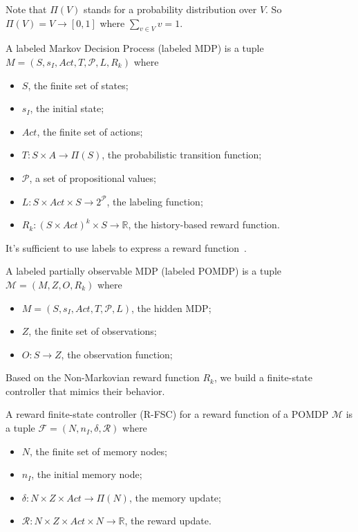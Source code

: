 Note that $\Pi(V)$ stands for a probability distribution over $V$. So $\Pi(V)=V\to [0,1]$ where $\sum_{v\in V}v=1$.

\begin{definition}
	A labeled Markov Decision Process (labeled MDP) is a tuple $M=(S,s_I,Act,T,\mathcal{P},L,R_k)$ where 
	\begin{itemize}
		\item $S$, the finite set of states;
		\item $s_I$, the initial state;
		\item $Act$, the finite set of actions;
		\item $T:S\times A\to \Pi(S)$, the probabilistic transition function;
		\item $\mathcal{P}$, a set of propositional values;
		\item $L:S\times Act\times S\to 2^\mathcal{P}$, the labeling function;
		\item $R_k:(S\times Act)^k\times S \to \mathbb{R}$, the history-based reward function.
	\end{itemize}
\end{definition}

It's sufficient to use labels to express a reward function~\cite{p:jirp}.

\begin{definition}
	A labeled partially observable MDP (labeled POMDP) is a tuple $\mathcal{M}=(M, Z, O, R_k)$ where 
	\begin{itemize}
		\item $M=(S,s_I,Act,T,\mathcal{P},L)$, the hidden MDP;
		\item $Z$, the finite set of observations;
		\item $O:S\to Z$, the observation function;
	\end{itemize}
\end{definition}

Based on the Non-Markovian reward function $R_k$, we build a finite-state controller that mimics their behavior.

\begin{definition}
	A reward finite-state controller (R-FSC) for a reward function of a POMDP $\mathcal{M}$ is a tuple $\mathcal{F}=(N,n_I,\delta,\mathcal{R})$ where
	\begin{itemize}
		\item $N$, the finite set of memory nodes;
		\item $n_I$, the initial memory node;
		\item $\delta: N \times Z \times Act \to \Pi(N)$, the memory update;
		\item $\mathcal{R}: N \times Z \times Act\times N \to \mathbb{R}$, the reward update. 
	\end{itemize}
\end{definition}


